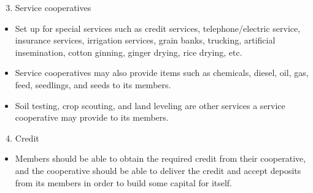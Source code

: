\documentclass[12pt,ignorenonframetext,aspectratio=169]{beamer}
\providecommand{\tightlist}{%
  \setlength{\itemsep}{0pt}\setlength{\parskip}{0pt}}
\begin{document}
\begin{frame}{}
\protect\hypertarget{section-3}{}
\begin{enumerate}
\setcounter{enumi}{2}
\tightlist
\item
  Service cooperatives
\end{enumerate}

\begin{itemize}
\tightlist
\item
  Set up for special services such as credit services,
  telephone/electric service, insurance services, irrigation services,
  grain banks, trucking, artificial insemination, cotton ginning, ginger
  drying, rice drying, etc.
\item
  Service cooperatives may also provide items such as chemicals, diesel,
  oil, gas, feed, seedlings, and seeds to its members.
\item
  Soil testing, crop scouting, and land leveling are other services a
  service cooperative may provide to its members.
\end{itemize}

\begin{enumerate}
\setcounter{enumi}{3}
\tightlist
\item
  Credit
\end{enumerate}

\begin{itemize}
\tightlist
\item
  Members should be able to obtain the required credit from their
  cooperative, and the cooperative should be able to deliver the credit
  and accept deposits from its members in order to build some capital
  for itself.
\end{itemize}
\end{frame}
\end{document}
